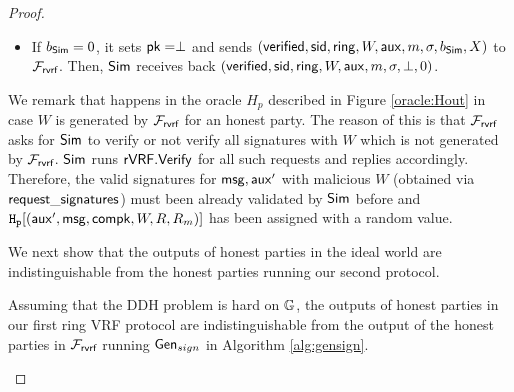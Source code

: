 \begin{proof}
\begin{itemize}
\begin{itemize}
			\item If $ b_{\mathsf{Sim}} = 0 $, it sets $ \mathsf{pk} = \perp $ and sends  $ (\mathsf{verified}, \textsf{sid}, \mathsf{ring}, W,\mathsf{aux}, m, \sigma, b_{\mathsf{Sim}}, X) $ to $ \mathcal{F}_{\textsf{rvrf}} $. Then, $ \mathsf{Sim} $ receives back $ (\mathsf{verified}, \textsf{sid}, \mathsf{ring}, W, \mathsf{aux},m, \sigma, \perp, 0) $. 
			
		\end{itemize}
		
		
		
		
		
		
	\end{itemize}
	
	We remark that  happens in the oracle $ H_p $ described in Figure \ref{oracle:Hout} in case  $ W $ is generated by $ \mathcal{F}_{\textsf{rvrf}} $ for an honest party. The reason of this is that $ \mathcal{F}_{\textsf{rvrf}} $ asks for $ \mathsf{Sim} $ to verify or not verify all signatures with  $ W $ which is not generated by $ \mathcal{F}_{\textsf{rvrf}} $. $ \mathsf{Sim} $ runs $ {\mathsf{rVRF}}.{\mathsf{Verify}} $ for all such requests and replies accordingly. Therefore, the valid signatures for $ \mathsf{msg}, \mathsf{aux}' $ with malicious $ W $ (obtained via $ \mathsf{request\_signatures} $) must been already validated by $ \mathsf{Sim} $ before and $ \mathtt{H_p}[(\mathsf{aux}', \mathsf{msg},\mathsf{compk},W,R,R_m)] $ has been assigned with a random value. 
	
	We next show that the outputs of honest parties in the ideal world are indistinguishable from the honest parties running our second protocol. 
	
	\begin{lemma}\label{lem:honestoutput}
		Assuming that the DDH problem is hard on $ {\mathbb{G}} $, the outputs of honest parties in  our first ring VRF protocol are indistinguishable from the output of the honest parties in $ \mathcal{F}_{\textsf{rvrf}} $ running $ \mathsf{Gen}_{sign} $  in Algorithm \ref{alg:gensign}.
	\end{lemma}


\end{proof}
